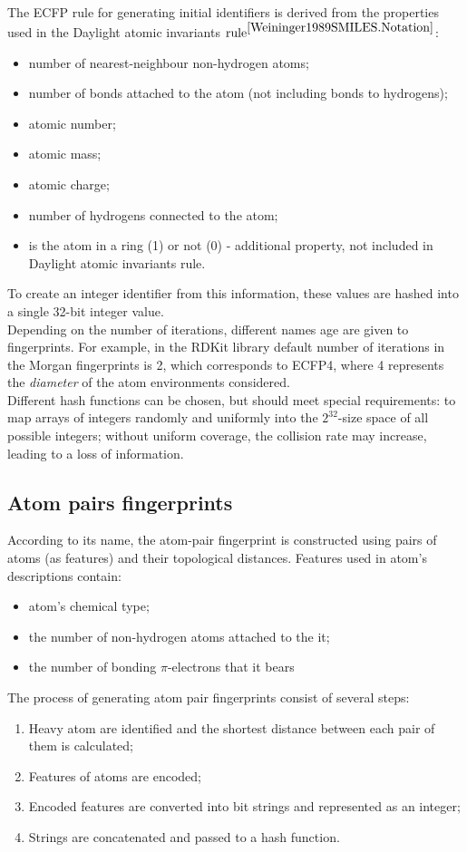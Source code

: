  The ECFP rule for generating initial identifiers is derived from the properties 
used in the Daylight atomic invariants $\text{rule}^{\cite{Weininger1989SMILES.Notation}}$:
 \begin{itemize}
     \item number of nearest-neighbour non-hydrogen atoms;
     \item number of bonds attached to the atom (not including bonds to hydrogens);
     \item atomic number;
     \item atomic mass;
     \item atomic charge;
     \item number of hydrogens connected to the atom;
     \item is the atom in a ring (1) or not (0) - additional property, not included in Daylight atomic invariants rule.
 \end{itemize}
 To create an integer identifier from this information, these values are hashed 
into a single 32-bit integer value.\\
 
 Depending on the number of iterations, different names age are given to fingerprints.
 For example, in the RDKit library default number of iterations in the Morgan fingerprints 
is 2, which corresponds to ECFP4, where 4 represents the \textit{diameter} of the 
atom environments considered.\\
 
 Different hash functions can be chosen, but should meet special requirements: to 
map arrays of integers randomly and uniformly into the $2^{32}$-size space of all 
possible integers; without uniform coverage, the collision rate may increase, leading 
to a loss of information.

\subsection{Atom pairs fingerprints}
 According to its name, the atom-pair fingerprint is constructed using pairs of 
atoms (as features) and their topological distances.
 Features used in atom's descriptions contain:
\begin{itemize}
    \item atom's chemical type;
    \item the number of non-hydrogen atoms attached to the it;
    \item the number of bonding $\pi$-electrons that it bears
\end{itemize}
The process of generating atom pair fingerprints consist of several steps:
\begin{enumerate}
    \item Heavy atom are identified and the shortest distance between each pair of them is calculated;
    \item Features of atoms are encoded;
    \item Encoded features are  converted into bit strings and represented as an integer;
    \item Strings are concatenated and passed to a hash function.
\end{enumerate}

